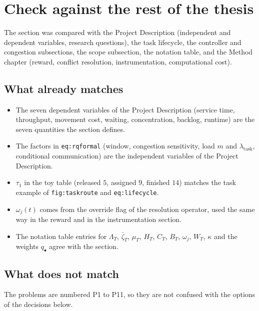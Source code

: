 \documentclass[11pt,a4paper]{article}
\begin{document}
\tableofcontents

\section{Check against the rest of the thesis}
\label{sec:check}

The section was compared with the Project Description (independent and
dependent variables, research questions), the task lifecycle, the
controller and congestion subsections, the scope subsection, the notation
table, and the Method chapter (reward, conflict resolution, instrumentation,
computational cost).

\subsection{What already matches}

\begin{itemize}[nosep]
  \item The seven dependent variables of the Project Description
    (service time, throughput, movement cost, waiting, concentration,
    backlog, runtime) are the seven quantities the section defines.
  \item The factors in \texttt{eq:rqformal} (window, congestion
    sensitivity, load $m$ and $\lambda_{\mathrm{task}}$, conditional
    communication) are the independent variables of the Project
    Description.
  \item $\tau_1$ in the toy table (released $5$, assigned $9$, finished
    $14$) matches the task example of \texttt{fig:taskroute} and
    \texttt{eq:lifecycle}.
  \item $\omega_j(t)$ comes from the override flag of the resolution
    operator, used the same way in the reward and in the instrumentation
    section.
  \item The notation table entries for $\Lambda_T$, $\bar\zeta_T$,
    $\mu_T$, $H_T$, $C_T$, $B_T$, $\omega_j$, $W_T$, $\kappa$ and the
    weights $q_\bullet$ agree with the section.
\end{itemize}

\subsection{What does not match}

\noindent The problems are numbered P1 to P11, so they are not confused with the options of the decisions below.
\end{document}
